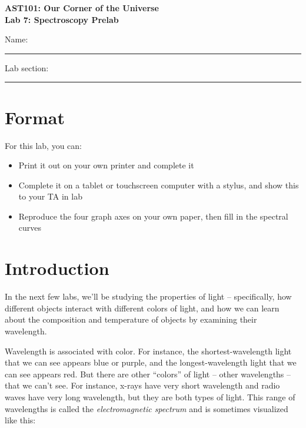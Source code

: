 \documentclass[11pt]{article}
\begin{document}
\begin{center}
\textbf{\Large
AST101: Our Corner of the Universe \\
\vspace*{0.1cm}
Lab 7: Spectroscopy Prelab 
}
\end{center}

\vspace*{0.5cm}

{\Large Name:}\vspace*{0.5cm}\\\hrule
{\Large Lab section:}\vspace*{0.5cm}\\\hrule
\vspace*{0.5cm}


\section{Format}

For this lab, you can:

\begin{itemize}
	\item Print it out on your own printer and complete it
	\item Complete it on a tablet or touchscreen computer with a stylus, and show this to your TA in lab
	\item Reproduce the four graph axes on your own paper, then fill in the spectral curves
\end{itemize}

\section{Introduction}

In the next few labs, we'll be studying the properties of light -- specifically, how different objects interact with different colors of light, and how we can learn about the composition and temperature of objects by examining their wavelength.

Wavelength is associated with color. For instance, the shortest-wavelength light that we can see appears blue or purple, and the longest-wavelength light that we can see appears red. But there are other ``colors'' of light -- other wavelengths -- that we 
can't see. For instance, x-rays have very short wavelength and radio waves have very long wavelength, but they are both types of light. This range of wavelengths is called the {\it electromagnetic spectrum} and is sometimes visualized like this:
\end{document}
